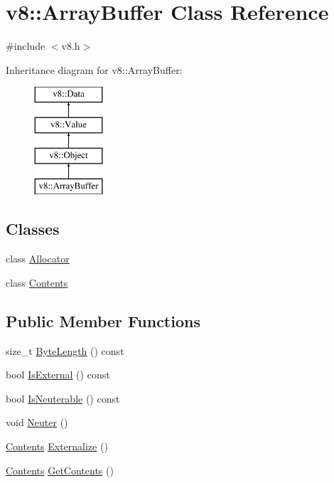 \hypertarget{classv8_1_1_array_buffer}{}\section{v8\+:\+:Array\+Buffer Class Reference}
\label{classv8_1_1_array_buffer}


{\ttfamily \#include $<$v8.\+h$>$}

Inheritance diagram for v8\+:\+:Array\+Buffer\+:\begin{figure}[H]
\begin{center}
\leavevmode
\includegraphics[height=4.000000cm]{classv8_1_1_array_buffer}
\end{center}
\end{figure}
\subsection*{Classes}
\begin{DoxyCompactItemize}
\item 
class \hyperlink{classv8_1_1_array_buffer_1_1_allocator}{Allocator}
\item 
class \hyperlink{classv8_1_1_array_buffer_1_1_contents}{Contents}
\end{DoxyCompactItemize}
\subsection*{Public Member Functions}
\begin{DoxyCompactItemize}
\item 
size\+\_\+t \hyperlink{classv8_1_1_array_buffer_ab73b98ba6436b57c5a1b3d29429e0199}{Byte\+Length} () const 
\item 
bool \hyperlink{classv8_1_1_array_buffer_a50dd263917559439525048c623425c6f}{Is\+External} () const 
\item 
bool \hyperlink{classv8_1_1_array_buffer_aed177cd83c3368837f740fa2929b3c8d}{Is\+Neuterable} () const 
\item 
void \hyperlink{classv8_1_1_array_buffer_a3420f7d38a8fe20e8f40fb82e6acb325}{Neuter} ()
\item 
\hyperlink{classv8_1_1_array_buffer_1_1_contents}{Contents} \hyperlink{classv8_1_1_array_buffer_a8b90b72486cfacb4fbec157f4803f889}{Externalize} ()
\item 
\hyperlink{classv8_1_1_array_buffer_1_1_contents}{Contents} \hyperlink{classv8_1_1_array_buffer_ae44291df12ca35de9b519e7372aa640a}{Get\+Contents} ()
\end{DoxyCompactItemize}
